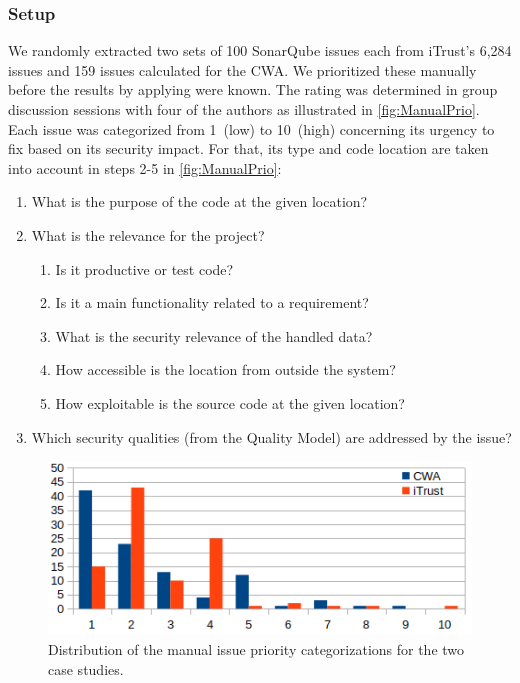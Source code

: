 \subsubsection{Setup}
We randomly extracted two sets of 100 SonarQube issues each from iTrust's 6,284 issues and 159 issues calculated for the CWA. %
We prioritized these manually before the results by applying \appr{} were known.
The rating was determined in group discussion sessions with four of the authors as illustrated in \autoref{fig:ManualPrio}.
Each issue was categorized from 1~(low) to 10~(high) %
concerning its urgency to fix based on its security impact.
For that, its type and code location are taken into account in steps 2-5 in \autoref{fig:ManualPrio}:
\begin{enumerate}[label=\alph*), ref=\alph*)]
    \item What is the purpose of the code at the given location?
    \item What is the relevance for the project?
    \begin{enumerate}[label=\roman*), ref=\roman*)]
        \item Is it productive or test code?
        \item Is it a main functionality related to a requirement?
        \item What is the security relevance of the handled data?
        \item How accessible is the location from outside the system?
        \item How exploitable is the source code at the given location?
    \end{enumerate}
    \item Which security qualities (from the Quality Model) are addressed by the issue?
\end{enumerate}

\begin{figure}
    \centering
    \includegraphics[width=.6\columnwidth]{figures/manual-rankings}
    \caption{Distribution of the manual issue priority categorizations for the two case studies.}
    \label{fig:manual-ranks}
\end{figure}

